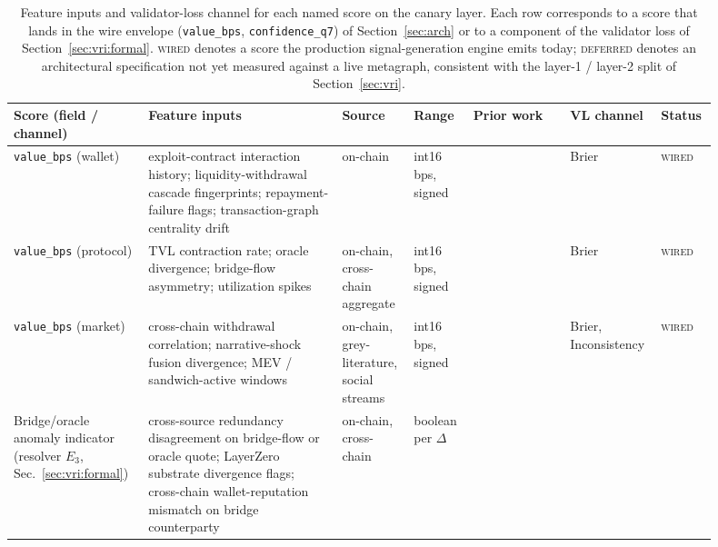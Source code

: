\documentclass[journal]{IEEEtran}
\begin{document}
\begin{table}[t]
\centering
\scriptsize
\caption{Feature inputs and validator-loss channel for each named
score on the canary layer. Each row corresponds to a score that lands
in the wire envelope (\texttt{value\_bps}, \texttt{confidence\_q7})
of Section~\ref{sec:arch} or to a component of the validator loss of
Section~\ref{sec:vri:formal}. \textsc{wired} denotes a score the
production signal-generation engine emits today; \textsc{deferred}
denotes an architectural specification not yet measured against a
live metagraph, consistent with the layer-1 / layer-2 split of
Section~\ref{sec:vri}.}
\label{tab:scoring-features}
\renewcommand{\arraystretch}{1.20}
\setlength{\tabcolsep}{3pt}
\begin{tabular}{@{}>{\raggedright\arraybackslash}p{0.18\linewidth} >{\raggedright\arraybackslash}p{0.26\linewidth} >{\raggedright\arraybackslash}p{0.09\linewidth} >{\raggedright\arraybackslash}p{0.08\linewidth} >{\raggedright\arraybackslash}p{0.13\linewidth} >{\raggedright\arraybackslash}p{0.09\linewidth} >{\raggedright\arraybackslash}p{0.07\linewidth}@{}}
\toprule
\textbf{Score (field / channel)} &
\textbf{Feature inputs} & \textbf{Source} & \textbf{Range} &
\textbf{Prior work} & \textbf{VL channel} & \textbf{Status} \\
\midrule
\texttt{value\_bps} (wallet) &
exploit-contract interaction history; liquidity-withdrawal cascade
fingerprints; repayment-failure flags; transaction-graph centrality
drift &
on-chain & int16 bps, signed &
\cite{ChenLZCLLLZ20,MotamedB19,palaiokrassas2023multichain} &
Brier & \textsc{wired} \\
\texttt{value\_bps} (protocol) &
TVL contraction rate; oracle divergence; bridge-flow asymmetry;
utilization spikes &
on-chain, cross-chain aggregate & int16 bps, signed &
\cite{ZhangZZL24,augusto2024sok,gogol2024liquidity} &
Brier & \textsc{wired} \\
\texttt{value\_bps} (market) &
cross-chain withdrawal correlation; narrative-shock fusion divergence;
MEV / sandwich-active windows &
on-chain, grey-literature, social streams & int16 bps, signed &
\cite{cong2022crypto,daian2020flash} &
Brier, Inconsistency & \textsc{wired} \\
Bridge/oracle anomaly indicator (resolver $E_3$,
Sec.~\ref{sec:vri:formal}) &
cross-source redundancy disagreement on bridge-flow or oracle quote;
LayerZero substrate divergence flags; cross-chain wallet-reputation
mismatch on bridge counterparty &
on-chain, cross-chain & boolean per $\Delta$ &
\cite{augusto2024sok,ZhangZZL24,werner2022sok,palaiokrassas2023multichain}

\end{tabular}
\end{table}
\end{document}
